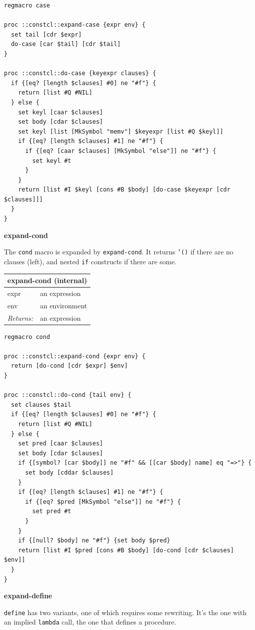 \documentclass[twoside,9pt]{report}
\begin{document}
\noindent\makebox[\linewidth]{\rule{\linewidth}{0.4pt}}
\begin{lstlisting}
regmacro case
 
proc ::constcl::expand-case {expr env} {
  set tail [cdr $expr]
  do-case [car $tail] [cdr $tail]
}
 
proc ::constcl::do-case {keyexpr clauses} {
  if {[eq? [length $clauses] #0] ne "#f"} {
    return [list #Q #NIL]
  } else {
    set keyl [caar $clauses]
    set body [cdar $clauses]
    set keyl [list [MkSymbol "memv"] $keyexpr [list #Q $keyl]]
    if {[eq? [length $clauses] #1] ne "#f"} {
      if {[eq? [caar $clauses] [MkSymbol "else"]] ne "#f"} {
        set keyl #t
      }
    }
    return [list #I $keyl [cons #B $body] [do-case $keyexpr [cdr $clauses]]]
  }
}
\end{lstlisting}
\noindent\makebox[\linewidth]{\rule{\linewidth}{0.4pt}}

\textbf{expand-cond}


The \texttt{cond} macro is expanded by \texttt{expand-cond}. It returns \texttt{'()} if there are no clauses (left), and nested \texttt{if} constructs if there are some.

\begin{tabular}{ |l l| }
\hline
\multicolumn{2}{|l|}{expand-cond (internal)} \\
\hline
expr & an expression \\
env & an environment \\
\textit{Returns:} & an expression \\
\hline
\end{tabular}

\noindent\makebox[\linewidth]{\rule{\linewidth}{0.4pt}}
\begin{lstlisting}
regmacro cond
 
proc ::constcl::expand-cond {expr env} {
  return [do-cond [cdr $expr] $env]
}
 
proc ::constcl::do-cond {tail env} {
  set clauses $tail
  if {[eq? [length $clauses] #0] ne "#f"} {
    return [list #Q #NIL]
  } else {
    set pred [caar $clauses]
    set body [cdar $clauses]
    if {[symbol? [car $body]] ne "#f" && [[car $body] name] eq "=>"} {
      set body [cddar $clauses]
    }
    if {[eq? [length $clauses] #1] ne "#f"} {
      if {[eq? $pred [MkSymbol "else"]] ne "#f"} {
        set pred #t
      }
    }
    if {[null? $body] ne "#f"} {set body $pred}
    return [list #I $pred [cons #B $body] [do-cond [cdr $clauses] $env]]
  }
}
\end{lstlisting}
\noindent\makebox[\linewidth]{\rule{\linewidth}{0.4pt}}

\textbf{expand-define}


\texttt{define} has two variants, one of which requires some rewriting. It's the one with an implied \texttt{lambda} call, the one that defines a procedure.
\end{document}
